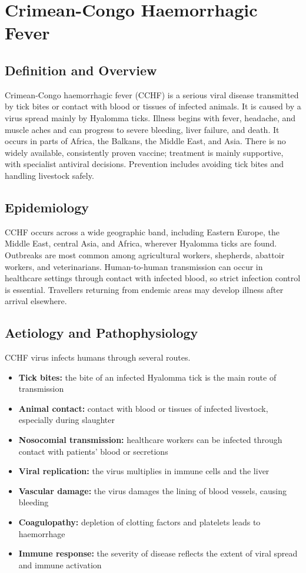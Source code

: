 \chapter{Crimean-Congo Haemorrhagic Fever}

\section*{Definition and Overview}
Crimean-Congo haemorrhagic fever (CCHF) is a serious viral disease transmitted by tick bites or contact with blood or tissues of infected animals. It is caused by a virus spread mainly by Hyalomma ticks. Illness begins with fever, headache, and muscle aches and can progress to severe bleeding, liver failure, and death. It occurs in parts of Africa, the Balkans, the Middle East, and Asia. There is no widely available, consistently proven vaccine; treatment is mainly supportive, with specialist antiviral decisions. Prevention includes avoiding tick bites and handling livestock safely.

\section*{Epidemiology}
CCHF occurs across a wide geographic band, including Eastern Europe, the Middle East, central Asia, and Africa, wherever Hyalomma ticks are found. Outbreaks are most common among agricultural workers, shepherds, abattoir workers, and veterinarians. Human-to-human transmission can occur in healthcare settings through contact with infected blood, so strict infection control is essential. Travellers returning from endemic areas may develop illness after arrival elsewhere.

\section*{Aetiology and Pathophysiology}
CCHF virus infects humans through several routes.

\begin{itemize}
    \item \textbf{Tick bites:} the bite of an infected Hyalomma tick is the main route of transmission
    \item \textbf{Animal contact:} contact with blood or tissues of infected livestock, especially during slaughter
    \item \textbf{Nosocomial transmission:} healthcare workers can be infected through contact with patients' blood or secretions
    \item \textbf{Viral replication:} the virus multiplies in immune cells and the liver
    \item \textbf{Vascular damage:} the virus damages the lining of blood vessels, causing bleeding
    \item \textbf{Coagulopathy:} depletion of clotting factors and platelets leads to haemorrhage
    \item \textbf{Immune response:} the severity of disease reflects the extent of viral spread and immune activation
\end{itemize}

